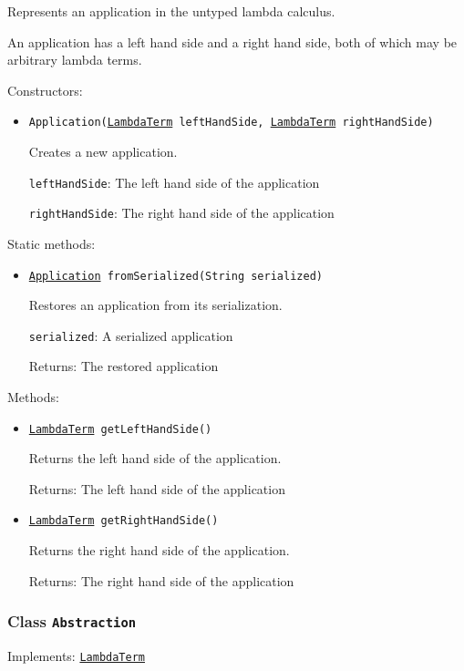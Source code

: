 Represents an application in the untyped lambda calculus.
 
 An application has a left hand side and a right hand side, both of which may
 be arbitrary lambda terms.

Constructors:
\begin{itemize}
\item \texttt{Application(\hyperref[type:edu.kit.wavelength.client.model.term.LambdaTerm]{LambdaTerm} leftHandSide, \hyperref[type:edu.kit.wavelength.client.model.term.LambdaTerm]{LambdaTerm} rightHandSide)}

Creates a new application.

\texttt{leftHandSide}: The left hand side of the application

\texttt{rightHandSide}: The right hand side of the application

\end{itemize}

Static methods:
\begin{itemize}
\item \texttt{\hyperref[type:edu.kit.wavelength.client.model.term.Application]{Application} fromSerialized(String serialized)}

Restores an application from its serialization.

\texttt{serialized}: A serialized application

Returns: The restored application

\end{itemize}

Methods:
\begin{itemize}
\item \texttt{\hyperref[type:edu.kit.wavelength.client.model.term.LambdaTerm]{LambdaTerm} getLeftHandSide()}

Returns the left hand side of the application.

Returns: The left hand side of the application

\item \texttt{\hyperref[type:edu.kit.wavelength.client.model.term.LambdaTerm]{LambdaTerm} getRightHandSide()}

Returns the right hand side of the application.

Returns: The right hand side of the application

\end{itemize}

\subsubsection{Class \texttt{Abstraction}}
\label{type:edu.kit.wavelength.client.model.term.Abstraction}
Implements: \texttt{\hyperref[type:edu.kit.wavelength.client.model.term.LambdaTerm]{LambdaTerm}}

